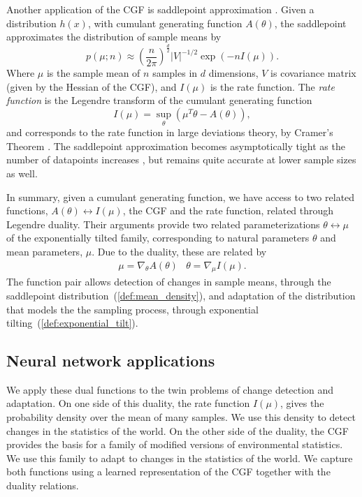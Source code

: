 \documentclass[11pt]{article}      %
\begin{document}
Another application of the CGF is saddlepoint approximation \cite{daniels_saddlepoint_1954,barndorff-nielsen_edgeworth_1979}.
Given a distribution $h(x)$, with cumulant generating function $A(\theta)$, the saddlepoint approximates the distribution of sample means by
\begin{equation}
  p(\mu; n) \approx \left( \frac{n}{2\pi} \right)^{\frac{d}{2}} |V|^{-1/2} \exp(-n I(\mu)). \label{def:mean_density}
\end{equation}
Where $\mu$ is the sample mean of $n$ samples in $d$ dimensions, $V$ is covariance matrix (given by the Hessian of the CGF), and $I(\mu)$ is the rate function.
The \textit{rate function} is the Legendre transform of the cumulant generating function
\begin{equation}
  I(\mu) = \sup_{\theta}(\mu^T \theta  - A(\theta) ), \label{eq:legendre_transform}
\end{equation}
and corresponds to the rate function in large deviations theory, by Cramer's Theorem \cite{dembo2009large}.
The saddlepoint approximation becomes asymptotically tight as the number of datapoints increases \cite{iltis_sharp_1995,chaganty_multidimensional_1986}, but remains quite accurate at lower sample sizes \cite{davison_saddlepoint_1988,ronchetti_empirical_1994} as well.

In summary, given a cumulant generating function, we have access to two related functions, $A(\theta) \leftrightarrow I(\mu)$, the CGF and the rate function, related through Legendre duality.
Their arguments provide two related parameterizations $\theta \leftrightarrow \mu$ of the exponentially tilted family, corresponding to natural parameters $\theta$ and mean parameters, $\mu$.
Due to the duality, these are related by 
\begin{eqnarray}
  \mu = \nabla_\theta A(\theta) & \theta = \nabla_\mu I(\mu). \label{eq:duality_relations}
\end{eqnarray}
The function pair allows detection of changes in sample means, through the saddlepoint distribution~(\ref{def:mean_density}), and adaptation of the distribution that models the the sampling process, through exponential tilting~(\ref{def:exponential_tilt}).


\subsection{Neural network applications}

We apply these dual functions to the twin problems of change detection and adaptation.
On one side of this duality, the rate function $I(\mu)$, gives the probability density over the mean of many samples.
We use this density to detect changes in the statistics of the world.
On the other side of the duality, the CGF provides the basis for a family of modified versions of environmental statistics.
We use this family to adapt to changes in the statistics of the world.
We capture both functions using a learned representation of the CGF together with the duality relations.
\end{document}

